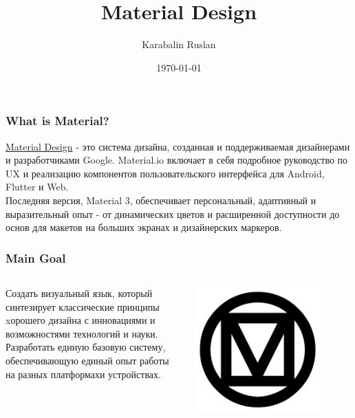 \documentclass[12pt]{beamer}
\title{Material Design}
\author{Karabalin Ruslan}
\date{\today}
\begin{document}
	
	\begin{frame}
		\titlepage
	\end{frame}
	
	\begin{frame}
		\frametitle{What is Material?}
		
		\href{https://m3.material.io/}{Material Design} - это система дизайна,
        созданная и поддерживаемая дизайнерами и разработчиками Google.
        Material.io включает в себя подробное руководство по UX
        и реализацию компонентов пользовательского интерфейса
        для Android, Flutter и Web. \\
		
		Последняя версия, Material 3,
        обеспечивает персональный, адаптивный
        и выразительный опыт - от динамических цветов
        и расширенной доступности до основ
        для макетов на больших экранах и дизайнерских маркеров.
		
	\end{frame}
	
	\begin{frame}
		\frametitle{Main Goal}

        \begin{columns}
            \begin{column}{0.5\textwidth}
                Создать визуальный язык,
                который синтезирует классические принципы
                xорошего дизайна с инновациями
                и возможностями технологий и науки. \\

                Разработать единую базовую систему,
                обеспечивающую единый опыт работы
                на разных платформахи устройствах.
            \end{column}
            
            \begin{column}{0.5\textwidth}
                \includegraphics[width=0.8\textwidth]{md.png}
            \end{column}

        \end{columns}

	\end{frame}
\end{document}
